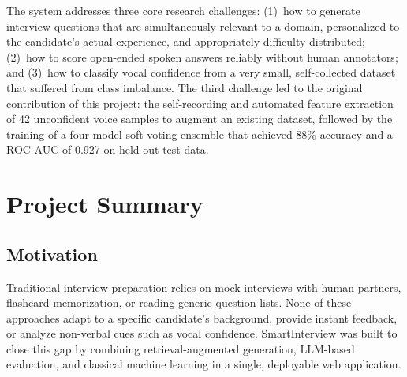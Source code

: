 \documentclass[12pt,a4paper]{article}
\begin{document}
The system addresses three core research challenges: (1)~how to generate interview questions that are simultaneously relevant to a domain, personalized to the candidate's actual experience, and appropriately difficulty-distributed; (2)~how to score open-ended spoken answers reliably without human annotators; and (3)~how to classify vocal confidence from a very small, self-collected dataset that suffered from class imbalance. The third challenge led to the original contribution of this project: the self-recording and automated feature extraction of 42 unconfident voice samples to augment an existing dataset, followed by the training of a four-model soft-voting ensemble that achieved 88\% accuracy and a ROC-AUC of 0.927 on held-out test data.

\section{Project Summary}

\subsection{Motivation}
Traditional interview preparation relies on mock interviews with human partners, flashcard memorization, or reading generic question lists. None of these approaches adapt to a specific candidate's background, provide instant feedback, or analyze non-verbal cues such as vocal confidence. SmartInterview was built to close this gap by combining retrieval-augmented generation, LLM-based evaluation, and classical machine learning in a single, deployable web application.
\end{document}
